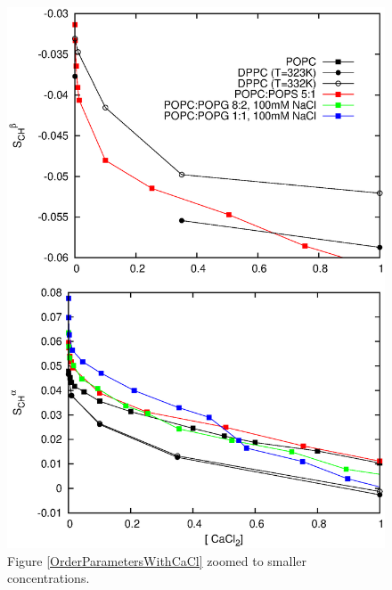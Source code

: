 \documentclass[aps,prl,superscriptaddress,twocolumn]{revtex4}
\begin{document}
\begin{figure}[]
  \centering
  \includegraphics[width=17.2cm]{../Figs/LIPIDSwithCaClBELOW1M.eps}
  \caption{\label{OrderParametersWithCaClBELOW1M}
    Figure \ref{OrderParametersWithCaCl} zoomed to smaller concentrations.
  }
\end{figure}
\end{document}

